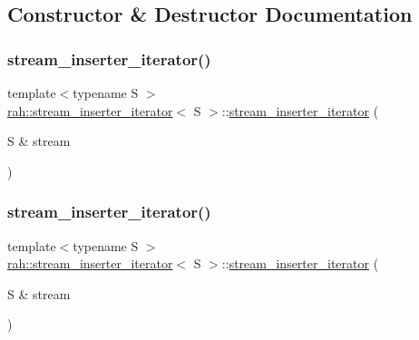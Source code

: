 \subsection{Constructor \& Destructor Documentation}
\mbox{\label{structrah_1_1stream__inserter__iterator_a0b096d8edfc691c1fdadd919252ce87d}} 
\subsubsection{\texorpdfstring{stream\_inserter\_iterator()}{stream\_inserter\_iterator()}\hspace{0.1cm}{\footnotesize\ttfamily [1/2]}}
{\footnotesize\ttfamily template$<$typename S $>$ \\
\mbox{\hyperlink{structrah_1_1stream__inserter__iterator}{rah\+::stream\+\_\+inserter\+\_\+iterator}}$<$ S $>$\+::\mbox{\hyperlink{structrah_1_1stream__inserter__iterator}{stream\+\_\+inserter\+\_\+iterator}} (\begin{DoxyParamCaption}\item[{S \&}]{stream }\end{DoxyParamCaption})\hspace{0.3cm}{\ttfamily [inline]}}

\mbox{\label{structrah_1_1stream__inserter__iterator_a0b096d8edfc691c1fdadd919252ce87d}} 
\subsubsection{\texorpdfstring{stream\_inserter\_iterator()}{stream\_inserter\_iterator()}\hspace{0.1cm}{\footnotesize\ttfamily [2/2]}}
{\footnotesize\ttfamily template$<$typename S $>$ \\
\mbox{\hyperlink{structrah_1_1stream__inserter__iterator}{rah\+::stream\+\_\+inserter\+\_\+iterator}}$<$ S $>$\+::\mbox{\hyperlink{structrah_1_1stream__inserter__iterator}{stream\+\_\+inserter\+\_\+iterator}} (\begin{DoxyParamCaption}\item[{S \&}]{stream }\end{DoxyParamCaption})\hspace{0.3cm}{\ttfamily [inline]}}



